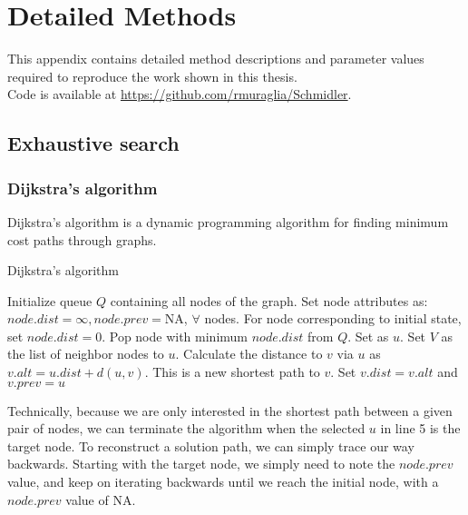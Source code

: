 

\chapter{Detailed Methods}

This appendix contains detailed method descriptions and parameter values required to reproduce the work shown in this thesis. \\
Code is available at \url{https://github.com/rmuraglia/Schmidler}.

\section{Exhaustive search} %
\label{sec:exhaustive_search}

\subsection{Dijkstra's algorithm} %
\label{sub:dijkstra_s_algorithm}

Dijkstra's algorithm is a dynamic programming algorithm for finding minimum cost paths through graphs.

\begin{algorithm}
\caption{Dijkstra's algorithm}
\begin{algorithmic}[1]
    \STATE Initialize queue $Q$ containing all nodes of the graph.
    \STATE Set node attributes as: $node.dist=\infty, node.prev=$NA, $\forall$ nodes.
    \STATE For node corresponding to initial state, set $node.dist=0$.
        \STATE Pop node with minimum $node.dist$ from $Q$. Set as $u$.
        \STATE Set $V$ as the list of neighbor nodes to $u$.
            \STATE Calculate the distance to $v$ via $u$ as $v.alt = u.dist + d(u,v)$.
            \STATE This is a new shortest path to $v$.
            \STATE Set $v.dist = v.alt$ and $v.prev = u$
            \ENDIF
        \ENDFOR
    \ENDWHILE
\end{algorithmic}
\end{algorithm}

Technically, because we are only interested in the shortest path between a given pair of nodes, we can terminate the algorithm when the selected $u$ in line 5 is the target node.
To reconstruct a solution path, we can simply trace our way backwards. 
Starting with the target node, we simply need to note the $node.prev$ value, and keep on iterating backwards until we reach the initial node, with a $node.prev$ value of NA.

